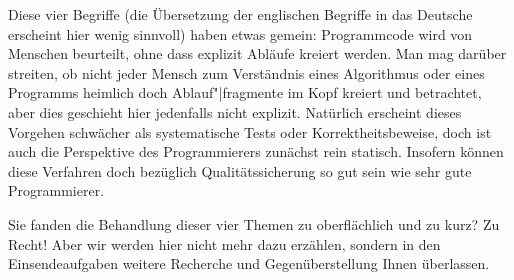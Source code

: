Diese vier Begriffe (die Übersetzung der englischen Begriffe in das Deutsche erscheint hier wenig sinnvoll) haben etwas gemein: Programmcode wird von Menschen be\-urteilt, ohne dass explizit Abläufe kreiert werden. Man mag darüber streiten, ob nicht jeder Mensch zum Verständnis eines Algorithmus oder eines Programms heimlich doch Ablauf"|fragmente im Kopf kreiert und betrachtet, aber dies geschieht hier jedenfalls nicht explizit. Natürlich erscheint dieses Vorgehen schwächer als systematische Tests oder Korrektheitsbeweise, doch ist auch die Perspektive des Programmierers zunächst rein statisch. Insofern können diese Verfahren doch bezüglich Qualitäts\-sicherung so gut sein wie sehr gute Programmierer.
	
Sie fanden die Behandlung dieser vier Themen zu oberflächlich und zu kurz? Zu Recht! Aber wir werden hier nicht mehr dazu erzählen, sondern in den Einsende\-aufgaben weitere Recherche und Gegenüberstellung Ihnen überlassen.


\clearpage





\pagebreak %




\clearpage







\clearpage
